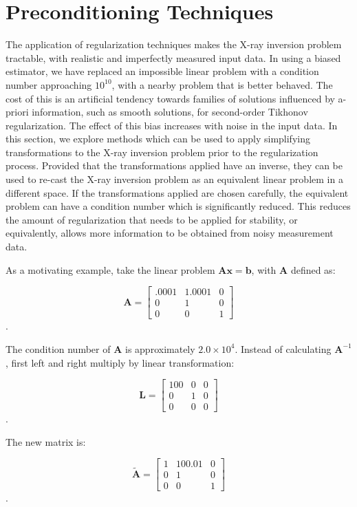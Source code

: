 \section{Preconditioning Techniques}

The application of regularization techniques makes the X-ray inversion problem tractable, with realistic and imperfectly measured input data. In using a biased estimator, we have replaced an impossible linear problem with a condition number approaching $10^{10}$, with a nearby problem that is better behaved. The cost of this is an artificial tendency towards families of solutions influenced by a-priori information, such as smooth solutions, for second-order Tikhonov regularization. The effect of this bias increases with noise in the input data. In this section, we explore methods which can be used to apply simplifying transformations to the X-ray inversion problem prior to the regularization process. Provided that the transformations applied have an inverse, they can be used to re-cast the X-ray inversion problem as an equivalent linear problem in a different space. If the transformations applied are chosen carefully, the equivalent problem can have a condition number which is significantly reduced. This reduces the amount of regularization that needs to be applied for stability, or equivalently, allows more information to be obtained from noisy measurement data. 

As a motivating example, take the linear problem $\mathbf{A}\mathbf{x} = \mathbf{b}$, with $\mathbf{A}$ defined as:

\[
\mathbf{A} = \begin{bmatrix} 
    .0001 & 1.0001 & 0 \\
    0 & 1 & 0 \\
    0 & 0 & 1
    \end{bmatrix}
\].

The condition number of $\mathbf{A}$ is approximately $2.0\times10^{4}$. Instead of calculating $\mathbf{A}^{-1}$, first left and right multiply by linear transformation:

\[
\mathbf{L} = \begin{bmatrix} 
    100 & 0 & 0  \\
    0 & 1  & 0 \\
    0 & 0 & 0
    \end{bmatrix}
\].

The new matrix is:

\[
\mathbf{\tilde{A}} = \begin{bmatrix} 
    1 & 100.01 & 0  \\
    0 & 1  & 0 \\
    0 & 0 & 1
    \end{bmatrix}
\].

